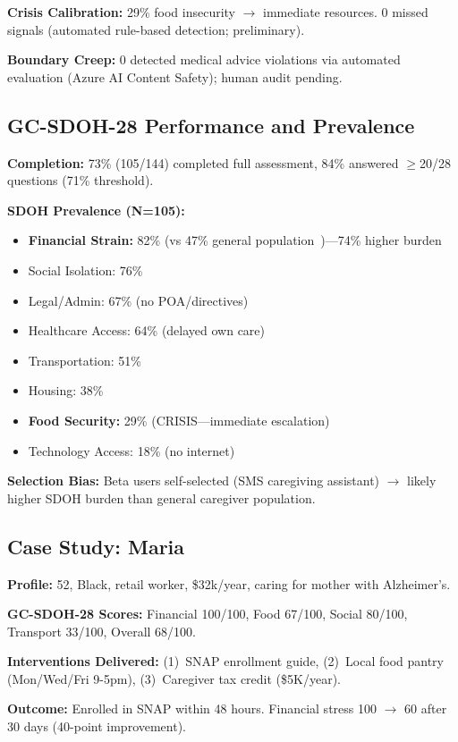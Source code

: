 \documentclass{article}
\begin{document}
\textbf{Crisis Calibration:} 29\% food insecurity $\rightarrow$ immediate resources. 0 missed signals (automated rule-based detection; preliminary).

\textbf{Boundary Creep:} 0 detected medical advice violations via automated evaluation (Azure AI Content Safety); human audit pending.

%
\subsection{GC{-}SDOH{-}28 Performance and Prevalence}%
\label{subsec:GC{-}SDOH{-}28PerformanceandPrevalence}%
\textbf{Completion:} 73\% (105/144) completed full assessment, 84\% answered $\geq$20/28 questions (71\% threshold).

\textbf{SDOH Prevalence (N=105):}
\begin{itemize}
    \item \textbf{Financial Strain:} 82\% (vs 47\% general population~\cite{aarp2025})—74\% higher burden
    \item Social Isolation: 76\%
    \item Legal/Admin: 67\% (no POA/directives)
    \item Healthcare Access: 64\% (delayed own care)
    \item Transportation: 51\%
    \item Housing: 38\%
    \item \textbf{Food Security:} 29\% (CRISIS—immediate escalation)
    \item Technology Access: 18\% (no internet)
\end{itemize}

\textbf{Selection Bias:} Beta users self-selected (SMS caregiving assistant) $\rightarrow$ likely higher SDOH burden than general caregiver population.

%
\subsection{Case Study: Maria}%
\label{subsec:CaseStudyMaria}%
\textbf{Profile:} 52, Black, retail worker, \$32k/year, caring for mother with Alzheimer's.

\textbf{GC-SDOH-28 Scores:} Financial 100/100, Food 67/100, Social 80/100, Transport 33/100, Overall 68/100.

\textbf{Interventions Delivered:} (1)~SNAP enrollment guide, (2)~Local food pantry (Mon/Wed/Fri 9-5pm), (3)~Caregiver tax credit (\$5K/year).

\textbf{Outcome:} Enrolled in SNAP within 48 hours. Financial stress 100 $\rightarrow$ 60 after 30 days (40-point improvement).
\end{document}
